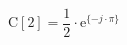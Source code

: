 \begin{center}
\[
\textrm{C}[2] = \frac{1}{2} \cdot \textrm{e}^{\{ -j \cdot \pi \}}
\]
\end{center}
